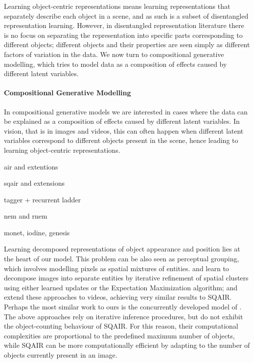 	
	Learning object-centric representations means learning representations that separately describe each object in a scene, and as such is a subset of disentangled representation learning.
	However, in disentangled representation literature there is no focus on separating the representation into specific parts corresponding to different objects; different objects and their properties are seen simply as different factors of variation in the data. 
	We now turn to compositional generative modelling, which tries to model data as a composition of effects caused by different latent variables.
	
	\paragraph{Compositional Generative Modelling}
	In compositional generative models we are interested in cases where the data can be explained as a composition of effects caused by different latent variables.
	In vision, that is in images and videos, this can often happen when different latent variables correspond to different objects present in the scene, hence leading to learning object-centric representations.
	
	air and extentions
	
	sqair and extensions
	
	tagger + recurrent ladder
	
	nem and rnem
	
	monet, iodine, genesis

	Learning decomposed representations of object appearance and position lies at the heart of our model.
	This problem can be also seen as perceptual grouping, which involves modelling pixels as spatial mixtures of entities.
	\cite{Greff2016tagger} and \cite{Greff2017neuralem} learn to decompose images into separate entities by iterative refinement of spatial clusters using either learned updates or the Expectation Maximization algorithm;
	\cite{Ilin2017recurrentln} and \cite{Steenkiste2018} extend these approaches to videos, achieving very similar results to \gls{SQAIR}.
	Perhaps the most similar work to ours is the concurrently developed model of \cite{Hsieh2018ddpae}.
	The above approaches rely on iterative inference procedures, but do not exhibit the object-counting behaviour of \gls{SQAIR}.
	For this reason, their computational complexities are proportional to the predefined maximum number of objects, while \gls{SQAIR} can be more computationally efficient by adapting to the number of objects currently present in an image.
	
